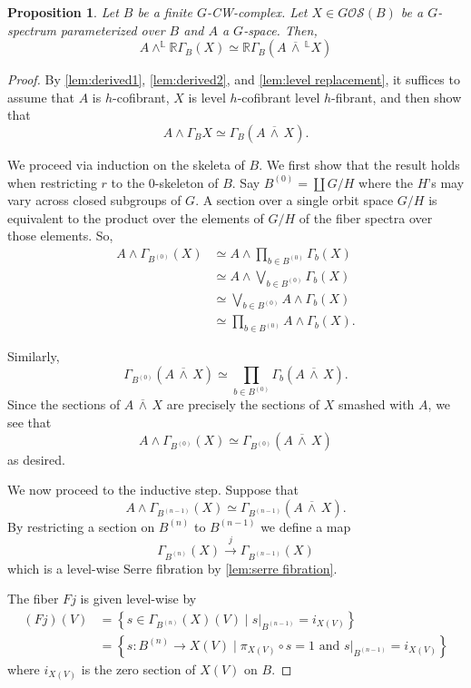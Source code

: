 \documentclass[11pt]{amsart}
\newcommand{\R}{\mathbb R}
\newcommand{\barsmash}{\,\overline\wedge\,}
\newcommand{\Osp}{\mathcal{OS}}
\theoremstyle{plain}   %
\newtheorem{prop}[thm]{Proposition}
\theoremstyle{definition}
\theoremstyle{remark}
\numberwithin{equation}{section}
\begin{document}
\begin{prop}\label{prop:sections commutes with smash}
Let $B$ be a finite $G$-CW-complex. Let $X\in G\Osp(B)$ be a $G$-spectrum parameterized over $B$ and $A$ a $G$-space. Then, 
\[
A \wedge^{\mathbb{L}} \R\Gamma_B(X) \simeq \R\Gamma_B(A \barsmash^{\mathbb{L}} X)
\]
\end{prop}
\begin{proof}
By \cref{lem:derived1}, \cref{lem:derived2}, and \cref{lem:level replacement}, it suffices to assume that $A$ is $h$-cofibrant, $X$ is level $h$-cofibrant level $h$-fibrant, and then show that 
\[
A\wedge \Gamma_B X \simeq \Gamma_B(A\barsmash X).
\]

We proceed via induction on the skeleta of $B$. We first show that the result holds when restricting $r$ to the 0-skeleton of $B$. Say $B^{(0)} = \coprod G/H$ where the $H$'s may vary across closed subgroups of $G$. A section over a single orbit space $G/H$ is equivalent to the product over the elements of $G/H$ of the fiber spectra over those elements. So,
\begin{align*}
A\wedge \Gamma_{B^{(0)}}(X)
&\simeq A \wedge \prod_{b\in B^{(0)}}\Gamma_b(X)\\
&\simeq A \wedge \bigvee_{b\in B^{(0)}}\Gamma_b(X)\\
&\simeq \bigvee_{b\in B^{(0)}}A \wedge \Gamma_b(X)\\
&\simeq \prod_{b\in B^{(0)}} A \wedge \Gamma_b(X).
\end{align*}

Similarly, 
\[
\Gamma_{B^{(0)}}(A \barsmash X) \simeq \prod_{b\in B^{(0)}} \Gamma_b(A \barsmash X).
\]
Since the sections of $A \barsmash X$ are precisely the sections of $X$ smashed with $A$, we see that
\[
A\wedge \Gamma_{B^{(0)}}(X)\simeq \Gamma_{B^{(0)}}(A \barsmash X)
\]
as desired. 

We now proceed to the inductive step. Suppose that
\[
A\wedge \Gamma_{B^{(n-1)}}(X) \simeq \Gamma_{B^{(n-1)}}(A\barsmash X).
\]
By restricting a section on $B^{(n)}$ to $B^{(n-1)}$ we define a map
\[
\Gamma_{B^{(n)}}(X) \xrightarrow{j} \Gamma_{B^{(n-1)}}(X)
\]
which is a level-wise Serre fibration by \cref{lem:serre fibration}. 

The fiber $Fj$ is given level-wise by
\begin{align*}
(Fj)(V)
&=\left\{ s\in \Gamma_{B^{(n)}}(X)(V)\mid s|_{B^{(n-1)}} = i_{X(V)} \right\}\\
& = \left\{s:B^{(n)}\to X(V)\mid \pi_{X(V)}\circ s = 1 \text{ and } s|_{B^{(n-1)}} = i_{X(V)}\right\}
\end{align*}
where $i_{X(V)}$ is the zero section of $X(V)$ on $B$. 


\end{proof}
\end{document}
